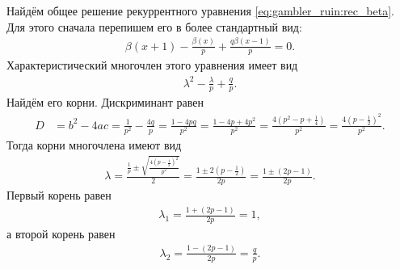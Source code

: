 \documentclass[../main.tex]{subfiles}
\begin{document}
\begin{exmpl}
  Найдём общее решение рекуррентного уравнения \eqref{eq:gambler_ruin:rec_beta}. Для этого сначала перепишем его в более стандартный вид:
  \begin{align*}
   \beta(x+1) - \frac{\beta(x)}{p} + \frac{q\beta(x-1)}{p} = 0.
  \end{align*} Характеристический многочлен этого уравнения имеет вид
  \begin{align*}
   \lambda^{2} - \frac{\lambda}{p} + \frac{q}{p}.
  \end{align*} Найдём его корни. Дискриминант равен
  \begin{align*}
   D &= b^{2} - 4ac = \frac{1}{p^{2}} - \frac{4q}{p} = \frac{1-4pq}{p^{2}} = \frac{1 - 4p + 4p^{2}}{p^{2}} = \frac{4(p^{2} - p + \frac{1}{4})}{p^{2}} = \frac{4(p - \frac{1}{2})^{2}}{p^{2}}.
  \end{align*} Тогда корни многочлена имеют вид
  \begin{align*}
   \lambda = \frac{\frac{1}{p} \pm \sqrt{ \frac{4(p - \frac{1}{2})^{2}}{p^{2}} }}{2} = \frac{1 \pm 2(p - \frac{1}{2})}{2p} = \frac{1 \pm (2p - 1)}{2p}.
  \end{align*} Первый корень равен
  \begin{align*}
   \lambda_1 = \frac{1 + (2p - 1)}{2p} = 1,
  \end{align*} а второй корень равен
  \begin{align*}
   \lambda_2 = \frac{1 - (2p - 1)}{2p} = \frac{q}{p}.
  \end{align*}


\end{exmpl}
\end{document}
